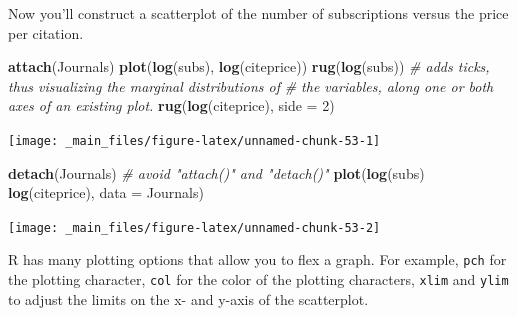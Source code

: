 \documentclass[
]{book}
\newenvironment{Shaded}{\begin{snugshade}}{\end{snugshade}}
\newcommand{\CommentTok}[1]{\textcolor[rgb]{0.56,0.35,0.01}{\textit{#1}}}
\newcommand{\DataTypeTok}[1]{\textcolor[rgb]{0.13,0.29,0.53}{#1}}
\newcommand{\DecValTok}[1]{\textcolor[rgb]{0.00,0.00,0.81}{#1}}
\newcommand{\KeywordTok}[1]{\textcolor[rgb]{0.13,0.29,0.53}{\textbf{#1}}}
\newcommand{\NormalTok}[1]{#1}
\newcommand{\OperatorTok}[1]{\textcolor[rgb]{0.81,0.36,0.00}{\textbf{#1}}}
\newcommand{\StringTok}[1]{\textcolor[rgb]{0.31,0.60,0.02}{#1}}
\begin{document}
\begin{Shaded}
\end{Shaded}

Now you'll construct a scatterplot of the number of subscriptions versus the price per citation.

\begin{Shaded}
\begin{Highlighting}[]
\KeywordTok{attach}\NormalTok{(Journals)}
\KeywordTok{plot}\NormalTok{(}\KeywordTok{log}\NormalTok{(subs), }\KeywordTok{log}\NormalTok{(citeprice))}
\KeywordTok{rug}\NormalTok{(}\KeywordTok{log}\NormalTok{(subs))	}\CommentTok{# adds ticks, thus visualizing the marginal distributions of}
			\CommentTok{# the variables, along one or both axes of an existing plot.		}
\KeywordTok{rug}\NormalTok{(}\KeywordTok{log}\NormalTok{(citeprice), }\DataTypeTok{side =} \DecValTok{2}\NormalTok{)}
\end{Highlighting}
\end{Shaded}

\begin{center}\texttt{[image: \_main\_files/figure-latex/unnamed-chunk-53-1]} \end{center}

\begin{Shaded}
\begin{Highlighting}[]
\KeywordTok{detach}\NormalTok{(Journals)}
\CommentTok{# avoid "attach()" and "detach()"}
\KeywordTok{plot}\NormalTok{(}\KeywordTok{log}\NormalTok{(subs) }\OperatorTok{~}\StringTok{ }\KeywordTok{log}\NormalTok{(citeprice), }\DataTypeTok{data =}\NormalTok{ Journals)}
\end{Highlighting}
\end{Shaded}

\begin{center}\texttt{[image: \_main\_files/figure-latex/unnamed-chunk-53-2]} \end{center}

R has many plotting options that allow you to flex a graph. For example, \texttt{pch} for the plotting character, \texttt{col} for the color of the plotting characters, \texttt{xlim} and \texttt{ylim} to adjust the limits on the x- and y-axis of the scatterplot.
\end{document}
